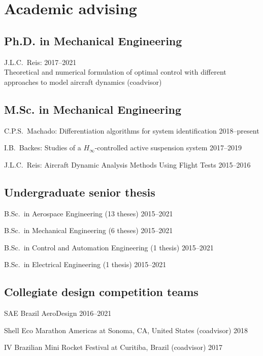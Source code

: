 \documentclass[letterpaper, 11pt, oneside]{memoir}
\begin{document}
\section{Academic advising}
\subsection{Ph.D. in Mechanical Engineering}
\begin{description}
\item {\textnormal{J.L.C.~Reis}}:
\hfill 2017--2021\\
Theoretical and numerical formulation of optimal control with different
approaches to model aircraft dynamics (coadvisor)
\end{description}

\subsection{M.Sc. in Mechanical Engineering}
\begin{description}
\item{\textnormal{C.P.S.~Machado:}} 
{Differentiation algorithms for system identification}
\hfill{2018--present}

\item {\textnormal{I.B.~Backes}}:
  {Studies of a $H_\infty$-controlled active suspension system}{}{}{}
  \hfill {2017--2019}

\item {\textnormal{J.L.C.~Reis}}:
  {Aircraft Dynamic Analysis Methods Using Flight Tests}{}{}{}
  \hfill {2015--2016}
\end{description}

\subsection{Undergraduate senior thesis}
\begin{description}
\item
  B.Sc.~in Aerospace Engineering (13 theses) \hfill {2015--2021}
\item
  B.Sc.~in Mechanical Engineering (6 theses) \hfill {2015--2021}
\item
  B.Sc.~in Control and Automation Engineering (1 thesis) \hfill {2015--2021} 
\item
  B.Sc.~in Electrical Engineering (1 thesis) \hfill {2015--2021} 
\end{description}

\subsection{Collegiate design competition teams}
\begin{description}
\item {SAE Brazil AeroDesign} \hfill 2016--2021
\item
{Shell Eco Marathon Americas at Sonoma, CA, United States (coadvisor)}
\hfill {2018}%
\item {IV Brazilian Mini Rocket Festival at Curitiba, Brazil (coadvisor)}
  \hfill {2017}
\end{description}
\end{document}

